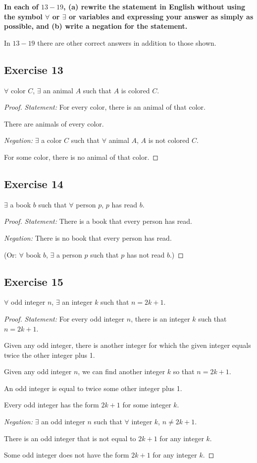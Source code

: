 \documentclass[14pt]{extarticle}
\newcommand{\fa}{\forall}
\newcommand{\te}{\exists}
\begin{document}
{\bf \color{cyan} In each of $13-19$, (a) rewrite the statement in English without using the symbol $\fa$ or $\te$ or variables and expressing your answer as simply as possible, and (b) write a negation for the statement.

In $13-19$ there are other correct answers in addition to
those shown.}

\subsection{Exercise 13}
$\fa$ color $C$, $\te$ an animal $A$ such that $A$ is colored $C$.

\begin{proof}
{\it Statement:} For every color, there is an animal of
that color. 

There are animals of every color.

{\it Negation:} $\te$ a color $C$ such that $\fa$ animal $A$, $A$ is not colored $C$.

For some color, there is no animal of that color.
\end{proof}

\subsection{Exercise 14}
$\te$ a book $b$ such that $\fa$ person $p$, $p$ has read $b$.

\begin{proof}
{\it Statement:} There is a book that every person has read.

{\it Negation:} There is no book that every person has read.

(Or: $\fa$ book $b$, $\te$ a person $p$ such that $p$ has not read $b$.)
\end{proof}

\subsection{Exercise 15}
$\fa$ odd integer $n$, $\te$ an integer $k$ such that $n = 2k + 1$.

\begin{proof}
{\it Statement:} For every odd integer $n$, there is an integer $k$ such that $n = 2k + 1$.

Given any odd integer, there is another integer for which the given integer equals twice the other integer plus 1. 

Given any odd integer $n$, we can find another integer $k$ so that $n = 2k + 1$.
 
An odd integer is equal to twice some other integer plus 1.

Every odd integer has the form $2k + 1$ for some integer $k$.

{\it Negation:} $\te$ an odd integer $n$ such that $\fa$ integer $k$, $n \neq 2k + 1$.

There is an odd integer that is not equal to $2k + 1$ for
any integer $k$.

Some odd integer does not have the form $2k + 1$ for any integer $k$.
\end{proof}
\end{document}
